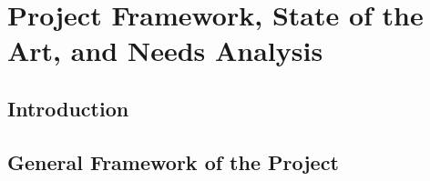 
\chapter{Project Framework, State of the Art, and Needs Analysis}
\minitoc

\section*{Introduction}



\section{General Framework of the Project}



